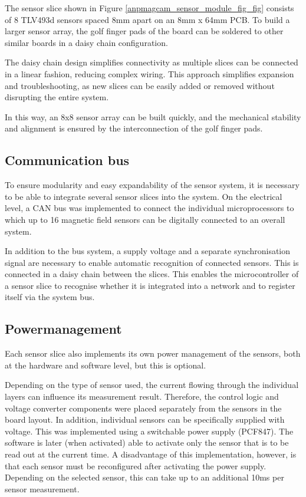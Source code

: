 \documentclass[conference]{IEEEtran}
\begin{document}
The sensor slice shown in Figure \ref{anpmagcam_sensor_module_fig_fig} consists of 8 TLV493d sensors spaced 8mm apart on an 8mm x 64mm PCB.
To build a larger sensor array, the golf finger pads of the board can be soldered to other similar boards in a daisy chain configuration.

The daisy chain design simplifies connectivity as multiple slices can be connected in a linear fashion, reducing complex wiring.
This approach simplifies expansion and troubleshooting, as new slices can be easily added or removed without disrupting the entire system.

In this way, an 8x8 sensor array can be built quickly, and the mechanical stability and alignment is ensured by the interconnection of the golf finger pads.

\subsection{Communication bus}

To ensure modularity and easy expandability of the sensor system, it is necessary to be able to integrate several sensor slices into the system.
On the electrical level, a CAN bus was implemented to connect the individual microprocessors to which up to 16 magnetic field sensors can be digitally connected to an overall system.

In addition to the bus system, a supply voltage and a separate synchronisation signal are necessary to enable automatic recognition of connected sensors. This is connected in a daisy chain between the slices.
This enables the microcontroller of a sensor slice to recognise whether it is integrated into a network and to register itself via the system bus.



\subsection{Powermanagement}

Each sensor slice also implements its own power management of the sensors, both at the hardware and software level, but this is optional.

Depending on the type of sensor used, the current flowing through the individual layers can influence its measurement result.
Therefore, the control logic and voltage converter components were placed separately from the sensors in the board layout.
In addition, individual sensors can be specifically supplied with voltage. This was implemented using a switchable power supply (PCF847). 
The software is later (when activated) able to activate only the sensor that is to be read out at the current time.
A disadvantage of this implementation, however, is that each sensor must be reconfigured after activating the power supply.
Depending on the selected sensor, this can take up to an additional 10ms per sensor measurement.
\end{document}
